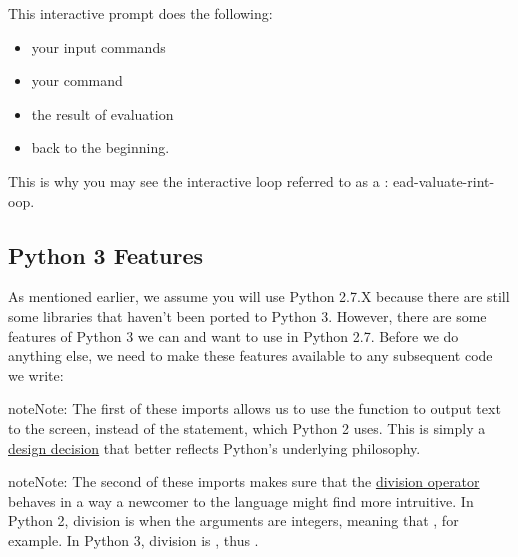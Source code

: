 This interactive prompt does the following:
\begin{itemize}
\item {} 
 your input commands

\item {} 
 your command

\item {} 
 the result of evaluation

\item {} 
 back to the beginning.

\end{itemize}

This is why you may see the interactive loop referred to as a
: ead-valuate-rint-oop.


\subsection{Python 3 Features}
\label{\detokenize{lesson/prg/python_intro:python-3-features}}
As mentioned earlier, we assume you will use Python 2.7.X because
there are still some libraries that haven't been ported to
Python 3. However, there are some features of Python 3 we can and want
to use in Python 2.7. Before we do anything else, we need to make
these features available to any subsequent code we write:

\begin{sphinxVerbatim}[commandchars=\\\{\}]
    
\end{sphinxVerbatim}

\begin{sphinxadmonition}{note}{Note:}
The first of these imports allows us to use the  function
to output text to the screen, instead of the  statement,
which Python 2 uses. This is simply a \href{https://www.python.org/dev/peps/pep-3105/}{design decision} that better reflects
Python's underlying philosophy.
\end{sphinxadmonition}

\begin{sphinxadmonition}{note}{Note:}
The second of these imports makes sure that the \href{https://www.python.org/dev/peps/pep-0238/}{division operator} behaves in a way a
newcomer to the language might find more intruitive. In Python 2,
division \sphinxcode{/} is  when the arguments are integers,
meaning that , for example. In Python 3, division
\sphinxcode{/} is , thus .
\end{sphinxadmonition}


